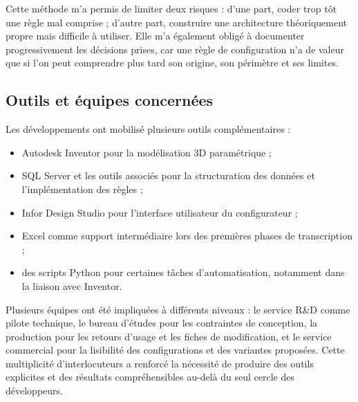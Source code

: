 Cette méthode m'a permis de limiter deux risques : d'une part, coder trop tôt une règle mal comprise ; d'autre part, construire une architecture théoriquement propre mais difficile à utiliser. Elle m'a également obligé à documenter progressivement les décisions prises, car une règle de configuration n'a de valeur que si l'on peut comprendre plus tard son origine, son périmètre et ses limites.

\subsection{Outils et équipes concernées}

Les développements ont mobilisé plusieurs outils complémentaires :

\begin{itemize}[leftmargin=1.4cm]
\item Autodesk Inventor pour la modélisation 3D paramétrique ;
\item SQL Server et les outils associés pour la structuration des données et l'implémentation des règles ;
\item Infor Design Studio pour l'interface utilisateur du configurateur ;
\item Excel comme support intermédiaire lors des premières phases de transcription ;
\item des scripts Python pour certaines tâches d'automatisation, notamment dans la liaison avec Inventor.
\end{itemize}

Plusieurs équipes ont été impliquées à différents niveaux : le service R\&D comme pilote technique, le bureau d'études pour les contraintes de conception, la production pour les retours d'usage et les fiches de modification, et le service commercial pour la lisibilité des configurations et des variantes proposées. Cette multiplicité d'interlocuteurs a renforcé la nécessité de produire des outils explicites et des résultats compréhensibles au-delà du seul cercle des développeurs.
